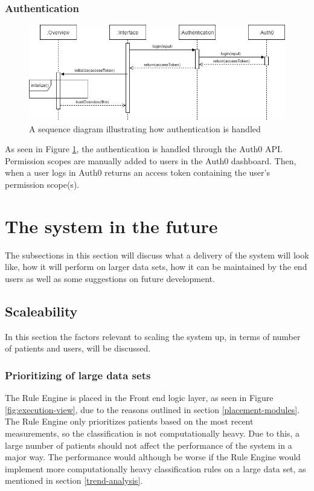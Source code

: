 \documentclass{article}
\begin{document}
\subsubsection{Authentication}
\begin{figure}[h]
    \centering
    \includegraphics[scale = 0.45]{auth-sequence-simple}
    \caption{A sequence diagram illustrating how authentication is handled}
    \label{fig:auth-sequence-simple}
\end{figure}

As seen in Figure \ref{fig:auth-sequence-simple}, the authentication is handled through the Auth0 API. Permission scopes are manually added to users in the Auth0 dashboard. Then, when a user logs in Auth0 returns an access token containing the user's permission scope(s).

\clearpage
\section{The system in the future}
The subsections in this section will discuss what a delivery of the system will look like, how it will perform on larger data sets, how it can be maintained by the end users as well as some suggestions on future development.

\subsection{Scaleability}
In this section the factors relevant to scaling the system up, in terms of number of patients and users, will be discussed.

\subsubsection{Prioritizing of large data sets}
The Rule Engine is placed in the Front end logic layer, as seen in Figure \ref{fig:execution-view}, due to the reasons outlined in section \ref{placement-modules}. The Rule Engine only prioritizes patients based on the most recent measurements, so the classification is not computationally heavy. Due to this, a large number of patients should not affect the performance of the system in a major way. The performance would although be worse if the Rule Engine would implement more computationally heavy classification rules on a large data set, as mentioned in section \ref{trend-analysis}.
\end{document}
